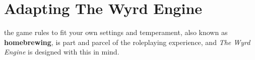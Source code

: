 \chapter{Adapting The Wyrd Engine}

 the game rules to fit your own settings and temperament, also known as \textbf{homebrewing}, is part and parcel of the roleplaying experience, and \emph{The Wyrd Engine} is designed with this in mind.
